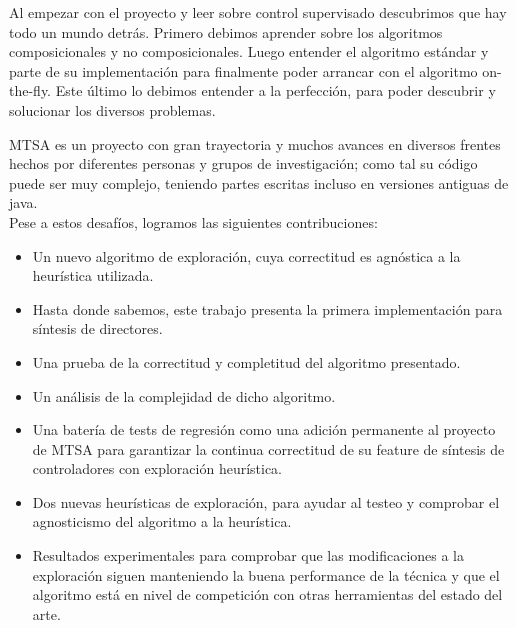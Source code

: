 % 
% 

Al empezar con el proyecto y leer sobre control supervisado descubrimos que hay todo un mundo detrás. Primero debimos aprender sobre los algoritmos composicionales y no composicionales. Luego entender el algoritmo estándar y parte de su implementación para finalmente poder arrancar con el algoritmo on-the-fly. Este último lo debimos entender a la perfección, para poder descubrir y solucionar los diversos problemas. 

MTSA es un proyecto con gran trayectoria y muchos avances en diversos frentes hechos por diferentes personas y grupos de investigación; como tal su código puede ser muy complejo, teniendo partes escritas incluso en versiones antiguas de java.\\

Pese a estos desafíos, logramos las siguientes contribuciones: 
\begin{itemize}
	
	\item Un nuevo algoritmo de exploración, cuya correctitud es agnóstica a la heurística utilizada.
	
	\item Hasta donde sabemos, este trabajo presenta la primera implementación para síntesis de directores.
	
	\item Una prueba de la correctitud y completitud del algoritmo presentado.
	
	\item Un análisis de la complejidad de dicho algoritmo.
	
	\item Una batería de tests de regresión como una adición permanente al proyecto de MTSA para garantizar la continua correctitud de su feature de síntesis de controladores con exploración heurística.
	
	\item Dos nuevas heurísticas de exploración, para ayudar al testeo y comprobar el agnosticismo del algoritmo a la heurística.
	
	\item Resultados experimentales para comprobar que las modificaciones a la exploración siguen manteniendo la buena performance de la técnica y que el algoritmo está en nivel de competición con otras herramientas del estado del arte.
\end{itemize}

